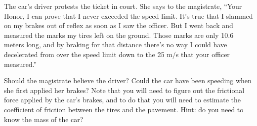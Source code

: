 \documentclass[12pt]{article}
\begin{document}
\begin{enumerate}
{The car's driver protests the ticket in court. She says to the magistrate, ``Your Honor, I can prove that I never exceeded the speed limit. It's true that I slammed on my brakes out of reflex as soon as I saw the officer. But I went back and measured the marks
my tires left on the ground. Those marks are only 10.6 meters long, and by braking for that distance there's no way I could have decelerated from over the speed limit down to the 25 m/s that your officer measured.''

Should the magistrate believe the driver? Could the car have been speeding when she first applied her brakes? Note that you will need to figure out the frictional force applied by the car's brakes, and to do that you will need to estimate the coefficient of 
friction between the tires and the pavement. Hint: do you need to know the mass of the car?}




 \end{enumerate}
 
\end{document}
